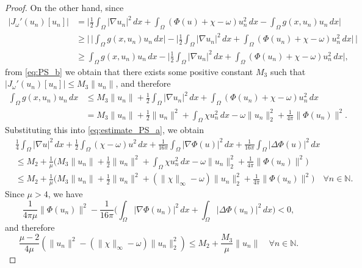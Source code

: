\documentclass[10pt,a4paper]{amsart}
\numberwithin{equation}{section}
\begin{document}
\begin{proof}
On the other hand, since
 \begin{align*}
 |J_\omega'(u_n)[u_n]|
& = \Big|\frac{1}{2} \int_\Omega |\nabla u_n|^2 \,dx 
  + \int_\Omega (\Phi(u) + \chi - \omega) u_n^2 \,dx 
  - \int_\Omega g(x, u_n) u_n \,dx\Big|  \\
& \geq \Big|\, \Big|\int_\Omega g(x, u_n) u_n \,dx\Big| 
  - \Big|\frac{1}{2} \int_\Omega |\nabla u_n|^2 \,dx 
   + \int_\Omega (\Phi(u_n) + \chi - \omega) u_n^2 \,dx\Big|\, \Big|  \\
& \geq \int_\Omega g(x, u_n) u_n \,dx 
 - \Big|\frac{1}{2} \int_\Omega |\nabla u_n|^2 \,dx 
 + \int_\Omega (\Phi(u_n) + \chi - \omega) u_n^2 \,dx\Big|,
\end{align*}
from \eqref{eq:PS_b} we obtain that there exists some positive constant $M_3$ such 
that $|J_\omega'(u_n)[u_n]| \leq M_3 \|u_n\|$, and therefore
\begin{align*}
 \int_\Omega g(x, u_n) u_n \,dx
 & \leq M_3 \|u_n\| + \frac{1}{2} \int_\Omega |\nabla u_n|^2 \,dx 
  + \int_\Omega (\Phi(u_n) + \chi - \omega) u_n^2 \,dx  \\
 & = M_3 \|u_n\| + \frac{1}{2} \|u_n\|^2 + \int_\Omega \chi u_n^2 \,dx 
  - \omega \|u_n\|_2^2 + \frac{1}{4\pi} \|\Phi(u_n)\|^2.
\end{align*}
Substituting this into \eqref{eq:estimate_PS_a}, we obtain
 \begin{align*}
&\frac{1}{4} \int_\Omega |\nabla u|^2 \,dx
  + \frac{1}{2} \int_\Omega (\chi - \omega) u^2 \,dx 
  + \frac{1}{16 \pi} \int_\Omega |\nabla \Phi(u)|^2 \,dx 
  + \frac{1}{16 \pi} \int_\Omega |\Delta \Phi(u)|^2 \,dx  \\
& \leq M_2 + \frac{1}{\mu}\Big(M_3 \|u_n\| + \frac{1}{2} \|u_n\|^2 
 + \int_\Omega \chi u_n^2 \,dx - \omega \|u_n\|_2^2 
 + \frac{1}{4\pi} \|\Phi(u_n)\|^2 \Big)  \\
& \leq M_2 + \frac{1}{\mu}\Big(M_3 \|u_n\| + \frac{1}{2} \|u_n\|^2 
 + (\|\chi\|_\infty - \omega) \|u_n\|_2^2 + \frac{1}{4\pi} \|\Phi(u_n)\|^2 \Big) 
 \quad \forall n \in \mathbb N.
 \end{align*}
Since $\mu > 4$, we have
 \[
 \frac{1}{4\pi \mu} \|\Phi(u_n)\|^2 
 - \frac{1}{16\pi} \Big(\int_\Omega |\nabla \Phi(u_n)|^2 \,dx 
 + \int_\Omega |\Delta \Phi(u_n)|^2 \,dx \Big) < 0,
 \]
and therefore
\begin{equation}
 \label{eq:estimate_PS_b}
 \frac{\mu - 2}{4\mu} (\|u_n\|^2 - (\|\chi\|_\infty 
 - \omega)\|u_n\|_2^2) \leq M_2 + \frac{M_3}{\mu} \|u_n\| 
 \quad \forall n \in \mathbb N.
\end{equation}


\end{proof}
\end{document}
